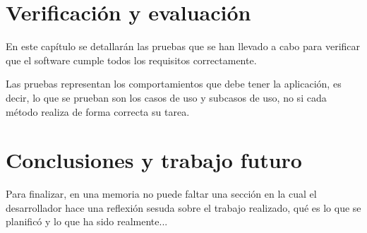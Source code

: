 \documentclass[12pt, a4paper]{report}
\begin{document}
\chapter{Verificaci\'on y evaluaci\'on}
En este cap\'itulo se detallar\'an las pruebas
que se han llevado a cabo para verificar que el software
cumple todos los requisitos correctamente.

Las pruebas representan los comportamientos que debe
tener la aplicaci\'on, es decir, lo que se prueban son los
casos de uso y subcasos de uso, no si cada m\'etodo
realiza de forma correcta su tarea.

\chapter{Conclusiones y trabajo futuro}
Para finalizar, en una memoria no puede faltar una secci\'on en la cual el 
desarrollador hace una reflexi\'on sesuda sobre el trabajo realizado, qu\'e es 
lo que se planific\'o y lo que ha sido realmente...
\end{document}
